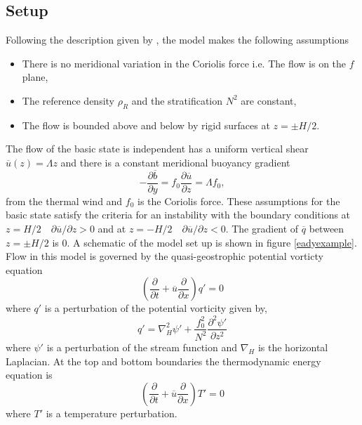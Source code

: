 \documentclass[a4paper,12pt]{article}
\begin{document}
\subsection{Setup}
Following the description given by \cite{Hoskins2013}, the model makes the following assumptions
\begin{itemize}
  \item There is no meridional variation in the Coriolis force i.e. The flow is on the $f$ plane,
  \item The reference density $\rho_R$ and the stratification $N^2$ are constant,
  \item The flow is bounded above and below by rigid surfaces at $z=\pm H/2$. 
\end{itemize}
The flow of the basic state is independent has a uniform vertical shear $\overline{u}(z) = \Lambda z$ and there is a constant meridional buoyancy gradient 
\begin{equation}
  -\frac{\partial\overline{b}}{\partial y} = f_0\frac{\partial\overline{u}}{\partial z}= \Lambda f_0,
\end{equation}
from the thermal wind and $f_0$ is the Coriolis force. These assumptions for the basic state satisfy the criteria for an instability with the boundary conditions at $ z= H/2 \quad \partial\overline u/\partial z > 0$ and at $ z= -H/2 \quad \partial\overline{u}/\partial z < 0$. The gradient of $\overline{q}$ between $z=\pm H/2$ is 0. A schematic of the model set up is shown in figure \ref{eadyexample}. Flow in this model is governed by the quasi-geostrophic potential vorticty equation
\begin{equation}
  \left(\frac{\partial}{\partial t} +\overline{u}\frac{\partial}{\partial x}\right)q' = 0 
\end{equation}
where $q'$ is a perturbation of the potential vorticity given by,
\begin{equation}
  q' = \nabla^2_{H} \psi' +\frac{f_0^2}{N^2}\frac{\partial^2\psi'}{\partial z^2}
\end{equation}
where $\psi'$ is a perturbation of the stream function and $\nabla_H$ is the horizontal Laplacian. At the top and bottom boundaries the thermodynamic energy equation is 
\begin{equation}
  \left(\frac{\partial}{\partial t}+\overline{u}\frac{\partial}{\partial x}\right)T' = 0
\end{equation}
where $T'$ is a temperature perturbation. 
\end{document}
